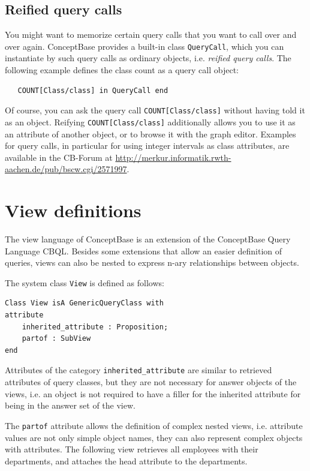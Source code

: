 \subsection{Reified query calls} \label{sec:reifiedquery}

You might want to memorize certain query calls that you want to call over and over again.
ConceptBase provides a built-in class {\tt QueryCall}, which you can instantiate by
such query calls as ordinary objects, i.e. {\em reified query calls}.
The following example defines the class count as a query call object:

\begin{verbatim}
   COUNT[Class/class] in QueryCall end
\end{verbatim}

Of course, you can ask the query call {\tt COUNT[Class/class]} without having told it as
an object. Reifying {\tt COUNT[Class/class]} additionally allows you to use it as an attribute of
another object, or to browse it with the graph editor.
Examples for query calls, in particular for using integer intervals as class attributes,
are available in the CB-Forum at
\url{http://merkur.informatik.rwth-aachen.de/pub/bscw.cgi/2571997}.


\section{View definitions}
\label{sec:views}

The view language of ConceptBase is an extension of the ConceptBase
Query Language CBQL.
Besides some extensions that allow an easier definition of queries, views
can also be nested to express n-ary relationships between objects.

The system class {\tt View} is defined as follows:

{\small
\begin{verbatim}
Class View isA GenericQueryClass with
attribute
    inherited_attribute : Proposition;
    partof : SubView
end
\end{verbatim}
}

Attributes of the category \verb+inherited_attribute+ are similar to
retrieved attributes of query classes, but they are not necessary
for answer objects of the views, i.e. an object is not required to have
a filler for the inherited attribute for being in the answer set
of the view.

The {\tt partof} attribute allows the definition of complex nested
views, i.e. attribute values are not only simple object names, they
can also represent complex objects with attributes.
The following view retrieves all employees with their departments,
and attaches the head attribute to the departments.

